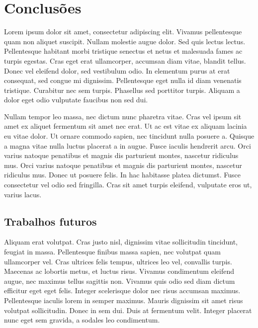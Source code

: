 \chapter{Conclusões}

Lorem ipsum dolor sit amet, consectetur adipiscing elit. Vivamus pellentesque quam non aliquet suscipit. Nullam molestie augue dolor. Sed quis lectus lectus. Pellentesque habitant morbi tristique senectus et netus et malesuada fames ac turpis egestas. Cras eget erat ullamcorper, accumsan diam vitae, blandit tellus. Donec vel eleifend dolor, sed vestibulum odio. In elementum purus at erat consequat, sed congue mi dignissim. Pellentesque eget nulla id diam venenatis tristique. Curabitur nec sem turpis. Phasellus sed porttitor turpis. Aliquam a dolor eget odio vulputate faucibus non sed dui.

Nullam tempor leo massa, nec dictum nunc pharetra vitae. Cras vel ipsum sit amet ex aliquet fermentum sit amet nec erat. Ut ac est vitae ex aliquam lacinia eu vitae dolor. Ut ornare commodo sapien, nec tincidunt nulla posuere a. Quisque a magna vitae nulla luctus placerat a in augue. Fusce iaculis hendrerit arcu. Orci varius natoque penatibus et magnis dis parturient montes, nascetur ridiculus mus. Orci varius natoque penatibus et magnis dis parturient montes, nascetur ridiculus mus. Donec ut posuere felis. In hac habitasse platea dictumst. Fusce consectetur vel odio sed fringilla. Cras sit amet turpis eleifend, vulputate eros ut, varius lacus.



\section{Trabalhos futuros}

Aliquam erat volutpat. Cras justo nisl, dignissim vitae sollicitudin tincidunt, feugiat in massa. Pellentesque finibus massa sapien, nec volutpat quam ullamcorper vel. Cras ultrices felis tempus, ultrices leo vel, convallis turpis. Maecenas ac lobortis metus, et luctus risus. Vivamus condimentum eleifend augue, nec maximus tellus sagittis non. Vivamus quis odio sed diam dictum efficitur eget eget felis. Integer scelerisque dolor nec risus accumsan maximus. Pellentesque iaculis lorem in semper maximus. Mauris dignissim sit amet risus volutpat sollicitudin. Donec in sem dui. Duis at fermentum velit. Integer placerat nunc eget sem gravida, a sodales leo condimentum.